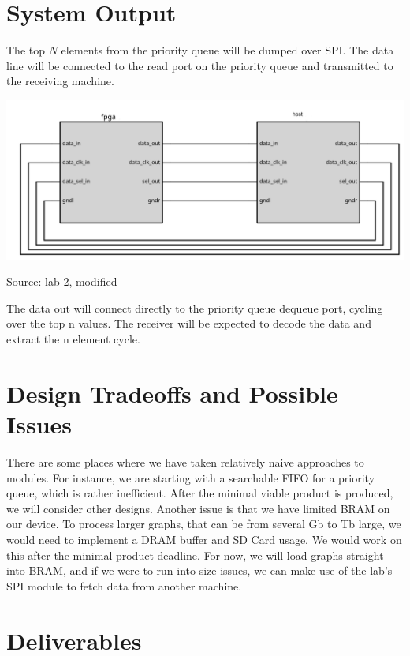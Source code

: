 \documentclass{article}
\begin{document}
\section{System Output}
The top $N$ elements from the priority queue will be dumped over SPI. The data line will be connected to the read port on the priority queue and transmitted to the receiving machine.

\includegraphics[width=14cm]{spi.png}

Source: lab 2, modified

The data out will connect directly to the priority queue dequeue port, cycling over the top n values. The receiver will be expected to decode the data and extract the n element cycle.

\section{Design Tradeoffs and Possible Issues}

There are some places where we have taken relatively naive approaches to modules. For instance, we are starting with a searchable FIFO for a priority queue, which is rather inefficient. After the minimal viable product is produced, we will consider other designs.  Another issue is that we have limited BRAM on our device. To process larger graphs, that can be from several Gb to Tb large, we would need to implement a DRAM buffer and SD Card usage. We would work on this after the minimal product deadline. For now, we will load graphs straight into BRAM, and if we were to run into size issues, we can make use of the lab's SPI module to fetch data from another machine.

\section{Deliverables}
\end{document}
